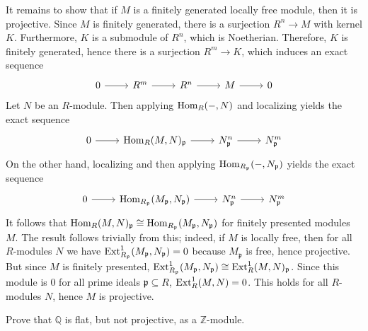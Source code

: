 \documentclass[../../master.tex]{subfiles}
\begin{document}
\begin{solution}
    It remains to show that if $M$ is a finitely generated locally free module, then it is projective.
    Since $M$ is finitely generated, there is a surjection $R^{n} \to M$ with kernel $K$.
    Furthermore, $K$ is a submodule of $R^{n}$, which is Noetherian.
    Therefore, $K$ is finitely generated, hence there is a surjection $R^{m} \to K$, which induces an exact sequence
    \[
    \begin{tikzcd}
        0 & R^{m} & R^{n} & M & 0
        \arrow[from=1-1, to=1-2]
        \arrow[from=1-2, to=1-3]
        \arrow[from=1-3, to=1-4]
        \arrow[from=1-4, to=1-5] 
    \end{tikzcd}
    \]
    Let $N$ be an $R$-module.
    Then applying $\operatorname{Hom}_R(-, N)$ and localizing yields the exact sequence
    \[
    \begin{tikzcd}
        0 & \Hom_R(M, N)_\mathfrak{p} & N^{n}_\mathfrak{p} & N^{m}_\mathfrak{p}
        \arrow[from=1-1, to=1-2]
        \arrow[from=1-2, to=1-3]
        \arrow[from=1-3, to=1-4]
    \end{tikzcd}
    \]
    On the other hand, localizing and then applying $\operatorname{Hom}_{R_\mathfrak{p}}(-, N_\mathfrak{p})$ yields the exact sequence
    \[
    \begin{tikzcd}
        0 & \Hom_{R_\mathfrak{p}}(M_\mathfrak{p}, N_\mathfrak{p}) & N_\mathfrak{p}^{n} & N_\mathfrak{p}^{m}
        \arrow[from=1-1, to=1-2]
        \arrow[from=1-2, to=1-3]
        \arrow[from=1-3, to=1-4]
    \end{tikzcd}
    \]
    It follows that $\operatorname{Hom}_R(M, N)_\mathfrak{p} \cong \operatorname{Hom}_{R_\mathfrak{p}}(M_\mathfrak{p}, N_\mathfrak{p})$ for finitely presented modules $M$.
    The result follows trivially from this;
    indeed, if $M$ is locally free, then for all $R$-modules $N$ we have $\operatorname{Ext}^{1}_{R_\mathfrak{p}}(M_\mathfrak{p}, N_\mathfrak{p}) = 0$ because $M_\mathfrak{p}$ is free, hence projective.
    But since $M$ is finitely presented, $\operatorname{Ext}_{R_\mathfrak{p}}^{1}(M_\mathfrak{p}, N_\mathfrak{p}) \cong \operatorname{Ext}_R^{1}(M, N)_\mathfrak{p}$.
    Since this module is 0 for all prime ideals $\mathfrak{p} \subseteq R$, $\operatorname{Ext}_R^{1}(M, N) = 0$.
    This holds for all $R$-modules $N$, hence $M$ is projective.
\end{solution}

\begin{problem}
    Prove that $\mathbb{Q}$ is flat, but not projective, as a $\mathbb{Z}$-module.
\end{problem}
\end{document}

